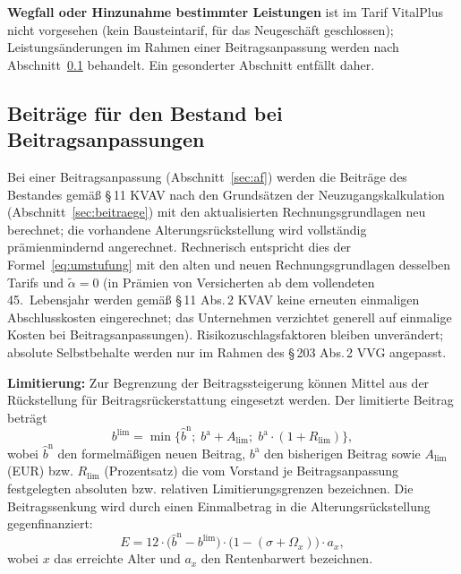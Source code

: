\textbf{Wegfall oder Hinzunahme bestimmter Leistungen} ist im Tarif
VitalPlus nicht vorgesehen (kein Bausteintarif, für das Neugeschäft
geschlossen); Leistungsänderungen im Rahmen einer Beitragsanpassung
werden nach Abschnitt~\ref{sec:bap} behandelt. Ein gesonderter
Abschnitt entfällt daher.

\subsection{Beiträge für den Bestand bei Beitragsanpassungen}\label{sec:bap}

Bei einer Beitragsanpassung (Abschnitt~\ref{sec:af}) werden die
Beiträge des Bestandes gemäß \S\,11 KVAV nach den Grundsätzen der
Neuzugangskalkulation (Abschnitt~\ref{sec:beitraege}) mit den
aktualisierten Rechnungsgrundlagen neu berechnet; die vorhandene
Alterungsrückstellung wird vollständig prämienmindernd angerechnet.
Rechnerisch entspricht dies der Formel~\eqref{eq:umstufung} mit den
alten und neuen Rechnungsgrundlagen desselben Tarifs und
$\tilde{\alpha} = 0$ (in Prämien von Versicherten ab dem vollendeten
45.~Lebensjahr werden gemäß \S\,11 Abs.\,2 KVAV keine erneuten
einmaligen Abschlusskosten eingerechnet; das Unternehmen verzichtet
generell auf einmalige Kosten bei Beitragsanpassungen).
Risikozuschlagsfaktoren bleiben unverändert; absolute Selbstbehalte
werden nur im Rahmen des \S\,203 Abs.\,2 VVG angepasst.

\textbf{Limitierung:} Zur Begrenzung der Beitragssteigerung können
Mittel aus der Rückstellung für Beitragsrückerstattung eingesetzt
werden. Der limitierte Beitrag beträgt
\begin{equation}
b^{\mathrm{lim}} = \min\bigl\{\hat{b}^{\mathrm{n}};\;
b^{\mathrm{a}} + A_{\mathrm{lim}};\; b^{\mathrm{a}}\cdot(1+R_{\mathrm{lim}})\bigr\},
\label{eq:limit}
\end{equation}
wobei $\hat{b}^{\mathrm{n}}$ den formelmäßigen neuen Beitrag, $b^{\mathrm{a}}$ den
bisherigen Beitrag sowie $A_{\mathrm{lim}}$ (EUR) bzw.
$R_{\mathrm{lim}}$ (Prozentsatz) die vom Vorstand je
Beitragsanpassung festgelegten absoluten bzw. relativen
Limitierungsgrenzen bezeichnen. Die Beitragssenkung wird durch einen
Einmalbetrag in die Alterungsrückstellung gegenfinanziert:
\begin{equation}
E = 12\cdot\bigl(\hat{b}^{\mathrm{n}} - b^{\mathrm{lim}}\bigr)\cdot
\bigl(1-(\sigma+\Omega_x)\bigr)\cdot a_x,
\label{eq:einmalbetrag}
\end{equation}
wobei $x$ das erreichte Alter und $a_x$ den Rentenbarwert bezeichnen.

